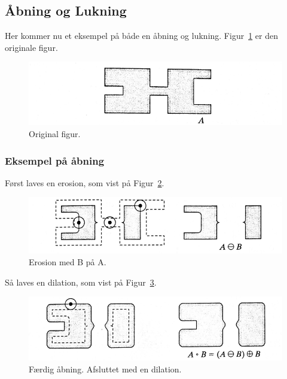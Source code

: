 \subsection{Åbning og Lukning}

Her kommer nu et eksempel på både en åbning og lukning. Figur~\ref{fig:a} er den originale figur.

\begin{figure}[H]
	\centering
	\includegraphics[width=0.9\linewidth]{figs/spm09/a}
	\caption{Original figur.}
	\label{fig:a}
\end{figure}

\subsubsection{Eksempel på åbning}

Først laves en erosion, som vist på Figur~\ref{fig:a-open-b}.

\begin{figure}[H]
	\centering
	\includegraphics[width=0.9\linewidth]{figs/spm09/a-open-b}
	\caption{Erosion med B på A.}
	\label{fig:a-open-b}
\end{figure}

Så laves en dilation, som vist på Figur~\ref{fig:a-open-b-done}.

\begin{figure}[H]
	\centering
	\includegraphics[width=0.9\linewidth]{figs/spm09/a-open-b-done}
	\caption{Færdig åbning. Afsluttet med en dilation.}
	\label{fig:a-open-b-done}
\end{figure}

